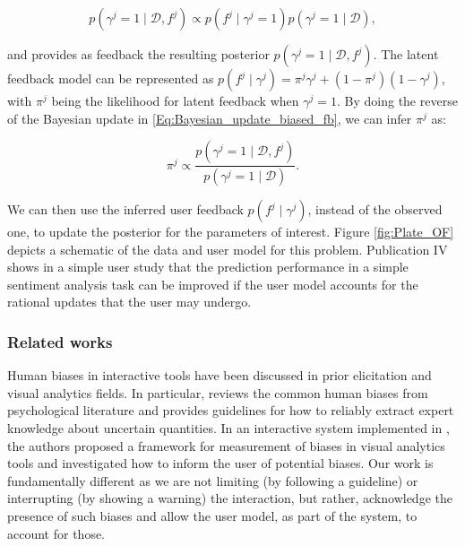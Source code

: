 \documentclass[dissertation,math,vertlayout,pdfa,colorlinks]{aaltoseries}
\newcommand{\bD}{\mathcal{D}}
\begin{document}
\begin{equation}\label{Eq:Bayesian_update_biased_fb}
p(\gamma^j=1 \mid \bD, f^{j}) \propto p(f^{j}\mid \gamma^j=1)p(\gamma^j =1\mid \bD),
\end{equation}  

\noindent and provides as feedback the resulting posterior  $p(\gamma^j=1 \mid \bD, f^{j})$. The latent feedback model can be represented as $p(f^{j}\mid \gamma^j) = \pi^j \gamma^j + (1-\pi^j) (1-\gamma^j)$, with $\pi^j$ being the likelihood for latent feedback when $\gamma^j=1$. By doing the reverse of the Bayesian update in \ref{Eq:Bayesian_update_biased_fb}, we can infer $\pi^j$ as:

\begin{equation}\label{Eq:latent_knowledge_infer}
\pi^j \propto \dfrac{p(\gamma^j=1 \mid \bD, f^{j})}{p(\gamma^j =1\mid \bD)}.
\end{equation}  

We can then use the inferred user feedback $p(f^{j}\mid \gamma^j)$, instead of the observed one, to update the posterior for the parameters of interest.  Figure \ref{fig:Plate_OF} depicts a schematic of the data and user model for this problem. Publication IV shows in a simple user study that the prediction performance in a simple sentiment analysis task can be improved if the user model accounts for the rational updates that the user may undergo.

\subsubsection{Related works}

Human biases in interactive tools have been discussed in prior elicitation \cite{garthwaite2005statistical} and visual analytics \cite{bias_warning} fields. In particular, \cite{garthwaite2005statistical} reviews the common human biases from psychological literature and provides guidelines for how to reliably extract expert knowledge about uncertain quantities. In an interactive system implemented in \cite{bias_warning}, the authors proposed a framework for measurement of biases in visual analytics tools and investigated how to inform the user of potential biases. Our work is fundamentally different as we are not limiting (by following a guideline) or interrupting (by showing a warning) the interaction, but rather, acknowledge the presence of such biases and allow the user model, as part of the system, to account for those.

\end{document}
